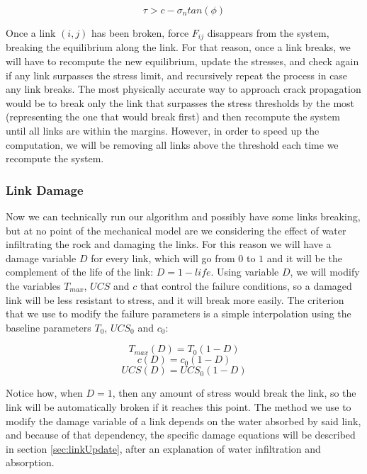 \begin{equation}
    \tau > c - \sigma_n tan(\phi)
\end{equation}

Once 
a link $(i,j)$ has been broken, force $F_{ij}$ disappears from 
the system, breaking the equilibrium along the link. For that reason, 
once a link breaks, we will have to recompute the new equilibrium, update 
the stresses, and check again if any link surpasses the stress limit, and 
recursively repeat the process in case any link breaks. The most physically 
accurate way to approach crack propagation would be to break only the 
link that surpasses the stress thresholds by the most (representing the one that 
would break first) and then recompute 
the system until all links are within the margins. However, in order to 
speed up the computation, we will be removing all links above the threshold 
each time we recompute the system.

\vspace{10pt}

\subsubsection{Link Damage}
Now we can technically run our algorithm and possibly have some 
links breaking, but at no point of the mechanical model are we considering
the effect of water infiltrating the rock and damaging the links. 
For this reason we will have a damage variable $D$ for every link, which will
go from $0$ to $1$ and it will be the complement of the life of the 
link: $D = 1 - life$. Using variable $D$, we will 
modify the variables $T_{max}$, $UCS$ and $c$ that control the failure conditions, 
so a damaged link will be less resistant to stress, and it will break 
more easily. The criterion that we use to modify the failure parameters 
is a simple interpolation using the baseline parameters $T_0$, $UCS_0$ and 
$c_0$:

\begin{equation}
    T_{max}(D) = T_0(1 - D)
\end{equation}
\begin{equation}
    c(D) = c_0(1 - D)
\end{equation}
\begin{equation}
    UCS(D) = UCS_0(1 - D)
\end{equation}


Notice how, when $D = 1$, then any amount of stress would break the 
link, so the link will be automatically broken if it reaches this point.
The method we use to modify the damage variable of a link depends 
on the water absorbed by said link, and because of that dependency, 
the specific damage equations will be 
described in section \ref{sec:linkUpdate}, after an explanation of 
water infiltration and absorption. 
